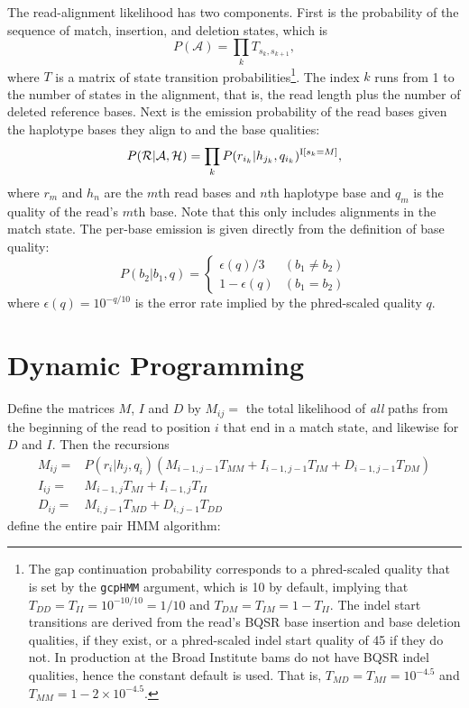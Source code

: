 \documentclass[nofootinbib,amssymb,amsmath]{revtex4}
\newcommand{\code}[1]{\texttt{#1}}
\newcommand{\mc}[1]{\mathcal{#1}}
\begin{document}
The read-alignment likelihood has two components.  First is the probability of the sequence of match, insertion, and deletion states, which is
\begin{equation}
P(\mc{A}) = \prod_k T_{s_k, s_{k+1}},
\end{equation}
where $T$ is a matrix of state transition probabilities\footnote{The gap continuation probability corresponds to a phred-scaled quality that is set by the \code{gcpHMM} argument, which is 10 by default, implying that $T_{DD} = T_{II} = 10^{-10/10} = 1/10$ and $T_{DM} = T_{IM} = 1 - T_{II}$.  The indel start transitions are derived from the read's BQSR base insertion and base deletion qualities, if they exist, or a phred-scaled indel start quality of 45 if they do not.  In production at the Broad Institute bams do not have BQSR indel qualities, hence the constant default is used.  That is, $T_{MD} = T_{MI} = 10^{-4.5}$ and $T_{MM} = 1 - 2 \times 10^{-4.5}$.}.  The index $k$ runs from 1 to the number of states in the alignment, that is, the read length plus the number of deleted reference bases.  Next is the emission probability of the read bases given the haplotype bases they align to and the base qualities:
\begin{equation}
P(\mc{R} | \mc{A}, \mc{H}) = \prod_k P(r_{i_k} | h_{j_k}, q_{i_k})^{{\rm I}[s_k = M]},
\end{equation}
where $r_m$ and $h_n$ are the $m$th read bases and $n$th haplotype base and $q_m$ is the quality of the read's $m$th base.  Note that this only includes alignments in the match state.  The per-base emission is given directly from the definition of base quality:
\begin{equation}
P(b_2 | b_1, q) = \left\{ \begin{array}{cc} \epsilon(q)/3 & (b_1 \ne b_2) \\ 1 - \epsilon(q) & (b_1 = b_2)  \end{array} \right.
\end{equation}
where $\epsilon(q) = 10^{-q/10}$ is the error rate implied by the phred-scaled quality $q$.

\section{Dynamic Programming}

Define the matrices $M$, $I$ and $D$ by $M_{ij} = $ the total likelihood of \textit{all} paths from the beginning of the read to position $i$ that end in a match state, and likewise for $D$ and $I$.  Then the recursions
\begin{align}
M_{ij} =& P(r_i | h_j, q_i) \left( M_{i-1,j-1} T_{MM} + I_{i-1,j-1} T_{IM} + D_{i-1,j-1} T_{DM} \right) \label{match} \\
I_{ij} =& M_{i-1,j} T_{MI} + I_{i-1,j} T_{II} \label{ins} \\
D_{ij} =& M_{i,j-1} T_{MD} + D_{i, j - 1} T_{DD} \label{del}
\end{align}
define the entire pair HMM algorithm:
\end{document}
